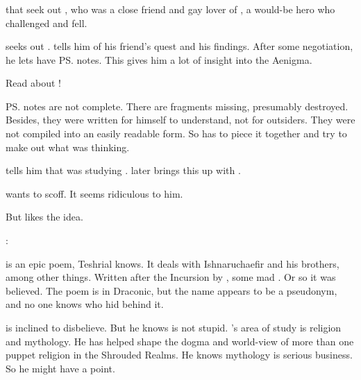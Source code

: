 \begin{garbage}
\subsubsection{\Nemuragh}
\Menessiaraid{}  that \Teshrial{} seek out \Nemuragh, who was a close friend and gay lover of \Lothagiel, a would-be hero who challenged \Ishnaruchaefir{} and fell. 

\Teshrial{} seeks out \Nemuragh. 
\Nemuragh{} tells him of his friend's quest and his findings. 
After some negotiation, he lets \Teshrial{} have \ps{\Lothagiel} notes. 
This gives him a lot of insight into the Aenigma. 

Read about \hs{\Lothagiel}!

\ps{\Lothagiel} notes are not complete. 
There are fragments missing, presumably destroyed. 
Besides, they were written for himself to understand, not for outsiders. 
They were not compiled into an easily readable form. 
So \Teshrial{} has to piece it together and try to make out what \Lothagiel{} was thinking. 

\Nemuragh{} tells him that \Lothagiel{} was studying \emph{\WanderersInDarkness}. 
\Teshrial{} later brings this up with \Menessiaraid. 

\begin{prose}
  \Teshrial{} wants to scoff. 
  It seems ridiculous to him. 
  
  But \Menessiaraid{} likes the idea.
  
  \Teshrial: 
  
  
  \WanderersInDarkness is an epic poem, Teshrial knows.
  It deals with Ishnaruchaefir and his brothers, among other things. 
  Written after the Incursion by \Melcryth, some mad \dragon.
  Or so it was believed.
  The poem is in Draconic, but the name \quo{\Melcryth} appears to be a pseudonym, and no one knows who hid behind it. 
  
  \Teshrial{} is inclined to disbelieve. 
  But he knows \Menessiaraid{} is not stupid.
  \Menessiaraid{}'s area of study is religion and mythology.
  He has helped shape the dogma and world-view of more than one puppet religion in the Shrouded Realms.
  He knows mythology is serious business.
  So he might have a point.
  

\end{prose}
\end{garbage}
